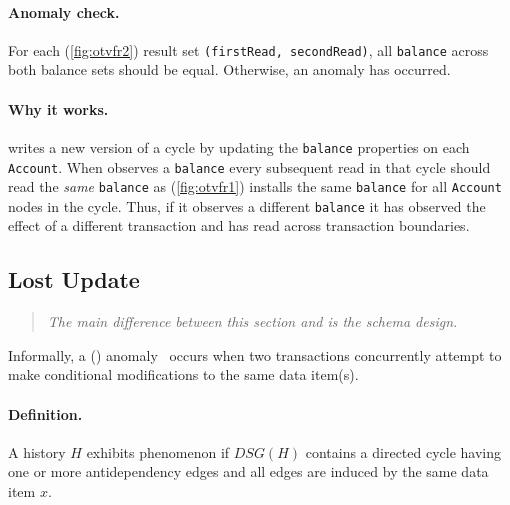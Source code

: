 \paragraph{Anomaly check.}
For each   (\autoref{fig:otvfr2}) result set 
\texttt{(firstRead, secondRead)}, all \texttt{balance} across both balance sets 
should be equal. Otherwise, an  anomaly has occurred.

\paragraph{Why it works.}
 writes a new version of a cycle by updating the 
\texttt{balance} properties on each \texttt{Account}. When  
observes a \texttt{balance} every subsequent read in that cycle should read the 
\emph{same} \texttt{balance} as  (\autoref{fig:otvfr1}) 
installs the same \texttt{balance} for all \texttt{Account} nodes in the cycle.
Thus, if it observes a different \texttt{balance} it has observed the effect of 
a different transaction and has read across transaction boundaries.


\subsection{Lost Update}
\label{sec:lost-update}

\begin{quote}
  \textit{The main difference between this section and \ldbcsnb\xspace
          is the schema design.
  }
\end{quote}

Informally, a  () 
anomaly~\cite{DBLP:journals/tods/BailisFGHS16} occurs when two transactions 
concurrently attempt to make conditional modifications to the same data item(s).

\paragraph{Definition.}
A history $H$ exhibits phenomenon  if $\textit{DSG}(H)$ contains a 
directed cycle having one or more antidependency edges and all edges are induced
by the same data item $x$.

